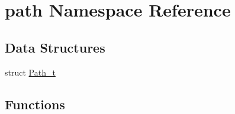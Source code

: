 \hypertarget{namespacepath}{}\section{path Namespace Reference}
\label{namespacepath}
\subsection*{Data Structures}
\begin{DoxyCompactItemize}
\item 
struct \hyperlink{structpath_1_1_path__t}{Path\+\_\+t}
\end{DoxyCompactItemize}
\subsection*{Functions}
